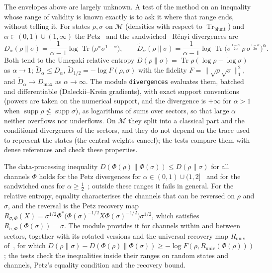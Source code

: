 \documentclass[11pt]{article}
\DeclareMathOperator{\Tr}{Tr}
\newcommand{\M}{\mathcal{M}}
\begin{document}
The envelopes above are largely unknown. A test of the method on an inequality whose range of validity is known
exactly is to ask it where that range ends, without telling it. For states $\rho,\sigma$ on $\M$ (densities with
respect to $\Tr_{\mathrm{blunt}}$) and $\alpha\in(0,1)\cup(1,\infty)$ the Petz~\cite{petz1986} and the
sandwiched~\cite{mullerlennert2013,wilde2014} Rényi divergences are
\[
  D_\alpha(\rho\|\sigma)=\frac{1}{\alpha-1}\log\Tr\bigl(\rho^\alpha\sigma^{1-\alpha}\bigr),\qquad
  \widetilde D_\alpha(\rho\|\sigma)=\frac{1}{\alpha-1}\log\Tr\bigl(\sigma^{\frac{1-\alpha}{2\alpha}}\,\rho\,
  \sigma^{\frac{1-\alpha}{2\alpha}}\bigr)^{\alpha}.
\]
Both tend to the Umegaki relative entropy $D(\rho\|\sigma)=\Tr\rho(\log\rho-\log\sigma)$ as $\alpha\to1$;
$\widetilde D_\alpha\le D_\alpha$, $\widetilde D_{1/2}=-\log F(\rho,\sigma)$ with the fidelity
$F=\|\sqrt\rho\sqrt\sigma\|_1^2$, and $\widetilde D_\alpha\to D_{\max}$ as $\alpha\to\infty$. The module
\texttt{divergences} evaluates them, batched and differentiable (Daleckii--Krein gradients), with exact support
conventions (powers are taken on the numerical support, and the divergence is $+\infty$ for $\alpha>1$ when
$\operatorname{supp}\rho\not\le\operatorname{supp}\sigma$), as logarithms of sums over sectors, so that large
$\alpha$ neither overflows nor underflows. On $\M$ they split into a classical part and the conditional divergences
of the sectors, and they do not depend on the trace used to represent the states (the central weights cancel); the
tests compare them with dense references and check these properties.

The data-processing inequality $D(\Phi(\rho)\|\Phi(\sigma))\le D(\rho\|\sigma)$ for all channels $\Phi$ holds for the
Petz divergences for $\alpha\in(0,1)\cup(1,2]$~\cite{petz1986} and for the sandwiched ones for
$\alpha\ge\frac12$~\cite{frank2013,beigi2013,mullerlennert2013,wilde2014}; outside these ranges it fails in general.
For the relative entropy, equality characterises the channels that can be reversed on $\rho$ and $\sigma$, and the
reversal is the Petz recovery map~\cite{petz1986suff}
$R_{\sigma,\Phi}(X)=\sigma^{1/2}\Phi^*\bigl(\Phi(\sigma)^{-1/2}X\Phi(\sigma)^{-1/2}\bigr)\sigma^{1/2}$, which satisfies
$R_{\sigma,\Phi}(\Phi(\sigma))=\sigma$. The module provides it for channels within and between sectors, together with
its rotated versions and the universal recovery map $R_{\mathrm{univ}}$ of~\cite{junge2018}, for which
$D(\rho\|\sigma)-D(\Phi(\rho)\|\Phi(\sigma))\ge-\log F(\rho,R_{\mathrm{univ}}(\Phi(\rho)))$; the tests check the
inequalities inside their ranges on random states and channels, Petz's equality condition and the recovery bound.
\end{document}
